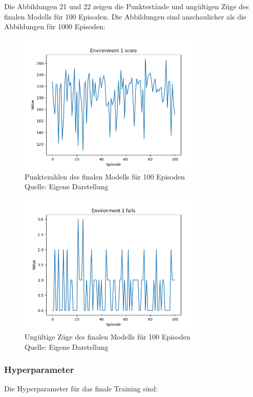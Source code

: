 Die Abbildungen 21 und 22 zeigen die Punktestände und ungültigen Züge des finalen Modells für 100 Episoden. Die Abbildungen sind anschaulicher als die Abbildungen für 1000 Episoden:
\nopagebreak
\begin{figure}[H]
	\centering
	\includegraphics[width=0.8\textwidth]{Bilder/final4000steps} 
	\caption[Punktezahlen des finalen Modells für 100 Episoden]{Punktezahlen des finalen Modells für 100 Episoden\\ Quelle: Eigene Darstellung}
\end{figure}
\begin{figure}[H]
	\centering
	\includegraphics[width=0.8\textwidth]{Bilder/final4000stepsf} 
	\caption[Ungültige Züge des finalen Modells für 100 Episoden]{Ungültige Züge des finalen Modells für 100 Episoden\\ Quelle: Eigene Darstellung}
\end{figure}
\subsubsection{Hyperparameter}
Die Hyperparameter für das finale Training sind:

